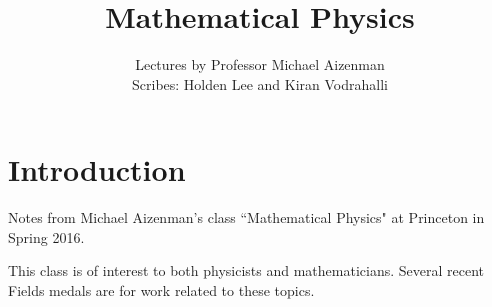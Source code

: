\documentclass[12pt]{book}
\theoremstyle{norm}
\begin{document}
%


\title{Mathematical Physics}
\author{Lectures by Professor Michael Aizenman \\ Scribes: Holden Lee and Kiran Vodrahalli}
\maketitle


\startcontents
{}

\chapter*{Introduction}
Notes from Michael Aizenman's class ``Mathematical Physics" at Princeton in Spring 2016. 

This class is of interest to both physicists and mathematicians. Several recent Fields medals are for work related to these topics.
\end{document}
